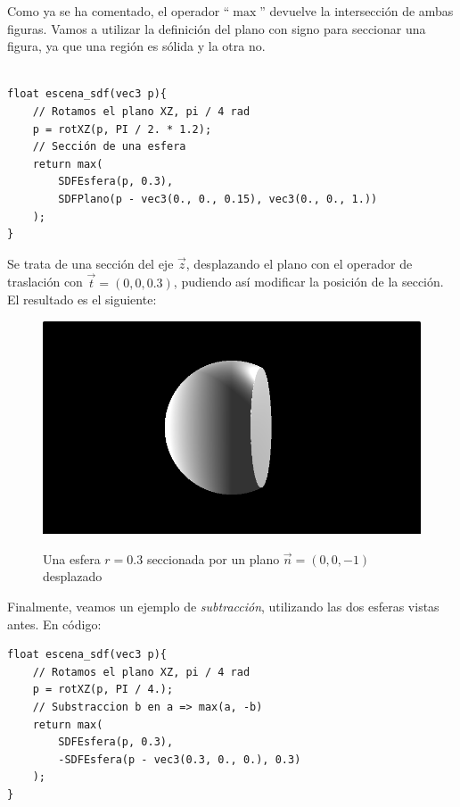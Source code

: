 Como ya se ha comentado, el operador \enquote{\(\max\)} devuelve la intersección de ambas figuras. Vamos a utilizar la definición del plano con signo para seccionar una figura, ya que una región es sólida y la otra no. \\\\

\begin{lstlisting}
float escena_sdf(vec3 p){
    // Rotamos el plano XZ, pi / 4 rad
    p = rotXZ(p, PI / 2. * 1.2);
	// Sección de una esfera
    return max(
        SDFEsfera(p, 0.3),
        SDFPlano(p - vec3(0., 0., 0.15), vec3(0., 0., 1.))
    );
}
\end{lstlisting}

Se trata de una sección del eje \(\Vec{z}\), desplazando el plano con el operador de traslación con \(\Vec{t}=(0,0,0.3)\), pudiendo así modificar la posición de la sección. El resultado es el siguiente:

\begin{figure}[H]
  \centering
  \captionsetup{justification=centering}%
  \includegraphics[width=1.0\textwidth]{secciones/imagenes/sdf/3d/sdf_seccion_3d.png}\label{fig:seccion}
  \caption{Una esfera \(r=0.3\) seccionada por un plano \(\Vec{n}=(0,0,-1)\) desplazado}
\end{figure}

Finalmente, veamos un ejemplo de \textit{subtracción}, utilizando las dos esferas vistas antes. En código:

\begin{lstlisting}
float escena_sdf(vec3 p){
    // Rotamos el plano XZ, pi / 4 rad
    p = rotXZ(p, PI / 4.);
    // Substraccion b en a => max(a, -b)
    return max(
        SDFEsfera(p, 0.3),
        -SDFEsfera(p - vec3(0.3, 0., 0.), 0.3)
    );
}
\end{lstlisting}

